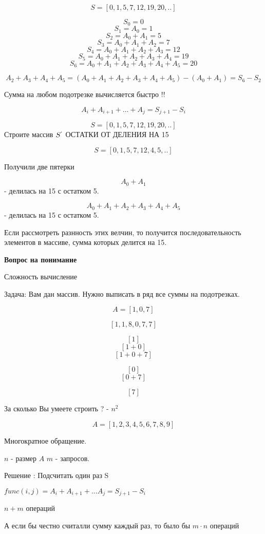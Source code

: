 \documentclass{article}
\begin{document}
$$ S = [0, 1, 5, 7, 12, 19, 20, .. ] $$ 

$$ S_0 = 0$$
$$S_1 = A_0 = 1$$
$$S_2 = A_0 + A_1 = 5$$
$$S_3 = A_0 + A_1 + A_2 = 7$$
$$S_4 = A_0 + A_1 + A_2 + A_3 = 12$$
$$S_5 = A_0 + A_1 + A_2 + A_3 + A_4 = 19$$
$$S_6 = A_0 + A_1 + A_2 + A_3 + A_4 + A_5= 20$$


$$ A_2 + A_3 + A_4  + A_5 = (A_0 + A_1 + A_2 + A_3 + A_4 + A_5) - (A_0 + A_1 ) = S_6 - S_2$$

Сумма на любом подотрезке вычисляется быстро !!


$$ A_i + A_{i + 1} + ... + A_{j} = S_{j + 1} - S_i$$

$$ S = [0, 1, 5, 7, 12, 19, 20, .. ] $$ 
Строите массив $S^`$ ОСТАТКИ ОТ ДЕЛЕНИЯ НА 15

$$ S = [0, 1, 5, 7, 12, 4, 5, .. ] $$ 

Получили две пятерки

$$ A_0 + A_1 $$ - делилась на 15 с остатком 5.

$$A_0 + A_1 + A_2 + A_3 + A_4 + A_5$$ - делилась на 15 с остатком 5.

Если рассмотреть разнность этих велчин, то получится последовательность элементов в массиве, сумма которых делится на 15.


\textbf{Вопрос на понимание}

Сложность вычисление 

Задача: Вам дан массив. Нужно выписать в ряд все суммы на подотрезках. 

$$ A = [1, 0, 7]$$

$$[1, 1, 8, 0, 7, 7]$$

$$[1]$$
$$[1 + 0]$$
$$[1 + 0 + 7]$$

$$[0]$$
$$[0 + 7]$$

$$[7]$$

За сколько Вы умеете строить ? - $n ^2$

$$A = [1,2, 3, 4, 5,6, 7, 8,9]$$

Многократное обращение.

$n$ - размер $A$
$m$ - запросов.
 
Решение :
Подсчитать один раз S

$func(i, j) = A_i + A_{i+ 1} + ... A_j = S_{j + 1} - S_i$

$n + m$ операций


А если бы честно считалли сумму каждый раз, то было бы 
$ m \cdot n$ операций
\end{document}
